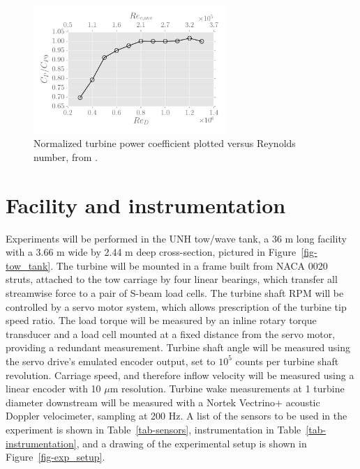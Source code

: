 \documentclass[12pt,letterpaper]{scrreprt}
\begin{document}
\begin{figure}[ht]
\centering
\includegraphics[width=0.65\textwidth]{Figures/re_dep_cp.pdf}
\caption{Normalized turbine power coefficient plotted versus Reynolds number, from \cite{Bachant2014}.}
\label{fig-cp_re_dep}
\end{figure}

\section{Facility and instrumentation}

Experiments will be performed in the UNH tow/wave tank, a 36 m long facility
with a 3.66 m wide by 2.44 m deep cross-section, pictured in
Figure~\ref{fig-tow_tank}. The turbine will be mounted in a frame built from
NACA 0020 struts, attached to the tow carriage by four linear bearings, which
transfer all streamwise force to a pair of S-beam load cells. The turbine shaft
RPM will be controlled by a servo motor system, which allows prescription of the
turbine tip speed ratio. The load torque will be measured by an inline rotary
torque transducer and a load cell mounted at a fixed distance from the servo
motor, providing a redundant measurement. Turbine shaft angle will be measured
using the servo drive's emulated encoder output, set to $10^5$ counts per
turbine shaft revolution. Carriage speed, and therefore inflow velocity will be
measured using a linear encoder with 10 $\mu$m resolution. Turbine wake
measurements at 1 turbine diameter downstream will be measured with a Nortek
Vectrino+ acoustic Doppler velocimeter, sampling at 200 Hz. A list of the
sensors to be used in the experiment is shown in Table~\ref{tab-sensors},
instrumentation in Table~\ref{tab-instrumentation}, and a drawing of the
experimental setup is shown in Figure~\ref{fig-exp_setup}.
\end{document}
